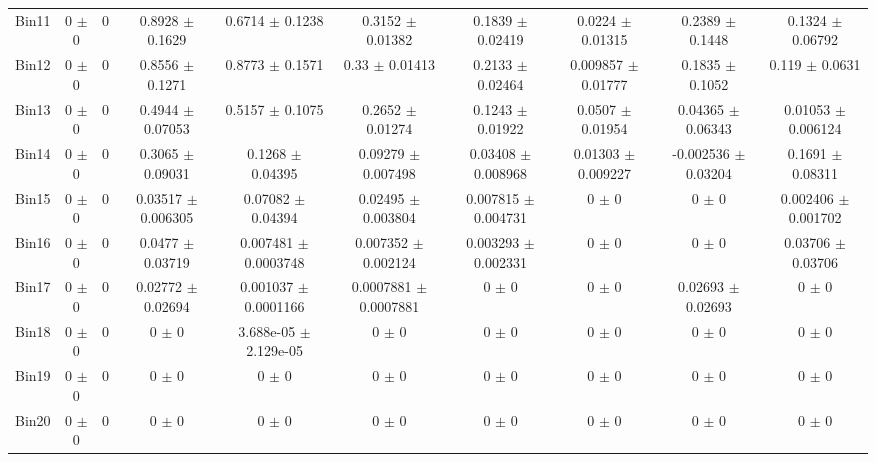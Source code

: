 \begin{tabular}{@{\extracolsep{4pt}}lccccccccc@{}}
     Bin11 & 0 $\pm$ 0 & 0 & 0.8928 $\pm$ 0.1629 & 0.6714 $\pm$ 0.1238 & 0.3152 $\pm$ 0.01382 & 0.1839 $\pm$ 0.02419 & 0.0224 $\pm$ 0.01315 & 0.2389 $\pm$ 0.1448 & 0.1324 $\pm$ 0.06792 \\ 
     Bin12 & 0 $\pm$ 0 & 0 & 0.8556 $\pm$ 0.1271 & 0.8773 $\pm$ 0.1571 & 0.33 $\pm$ 0.01413 & 0.2133 $\pm$ 0.02464 & 0.009857 $\pm$ 0.01777 & 0.1835 $\pm$ 0.1052 & 0.119 $\pm$ 0.0631 \\ 
     Bin13 & 0 $\pm$ 0 & 0 & 0.4944 $\pm$ 0.07053 & 0.5157 $\pm$ 0.1075 & 0.2652 $\pm$ 0.01274 & 0.1243 $\pm$ 0.01922 & 0.0507 $\pm$ 0.01954 & 0.04365 $\pm$ 0.06343 & 0.01053 $\pm$ 0.006124 \\ 
     Bin14 & 0 $\pm$ 0 & 0 & 0.3065 $\pm$ 0.09031 & 0.1268 $\pm$ 0.04395 & 0.09279 $\pm$ 0.007498 & 0.03408 $\pm$ 0.008968 & 0.01303 $\pm$ 0.009227 & -0.002536 $\pm$ 0.03204 & 0.1691 $\pm$ 0.08311 \\ 
     Bin15 & 0 $\pm$ 0 & 0 & 0.03517 $\pm$ 0.006305 & 0.07082 $\pm$ 0.04394 & 0.02495 $\pm$ 0.003804 & 0.007815 $\pm$ 0.004731 & 0 $\pm$ 0 & 0 $\pm$ 0 & 0.002406 $\pm$ 0.001702 \\ 
     Bin16 & 0 $\pm$ 0 & 0 & 0.0477 $\pm$ 0.03719 & 0.007481 $\pm$ 0.0003748 & 0.007352 $\pm$ 0.002124 & 0.003293 $\pm$ 0.002331 & 0 $\pm$ 0 & 0 $\pm$ 0 & 0.03706 $\pm$ 0.03706 \\ 
     Bin17 & 0 $\pm$ 0 & 0 & 0.02772 $\pm$ 0.02694 & 0.001037 $\pm$ 0.0001166 & 0.0007881 $\pm$ 0.0007881 & 0 $\pm$ 0 & 0 $\pm$ 0 & 0.02693 $\pm$ 0.02693 & 0 $\pm$ 0 \\ 
     Bin18 & 0 $\pm$ 0 & 0 & 0 $\pm$ 0 & 3.688e-05 $\pm$ 2.129e-05 & 0 $\pm$ 0 & 0 $\pm$ 0 & 0 $\pm$ 0 & 0 $\pm$ 0 & 0 $\pm$ 0 \\ 
     Bin19 & 0 $\pm$ 0 & 0 & 0 $\pm$ 0 & 0 $\pm$ 0 & 0 $\pm$ 0 & 0 $\pm$ 0 & 0 $\pm$ 0 & 0 $\pm$ 0 & 0 $\pm$ 0 \\ 
     Bin20 & 0 $\pm$ 0 & 0 & 0 $\pm$ 0 & 0 $\pm$ 0 & 0 $\pm$ 0 & 0 $\pm$ 0 & 0 $\pm$ 0 & 0 $\pm$ 0 & 0 $\pm$ 0 \\ 
\hline\hline
  \end{tabular}
